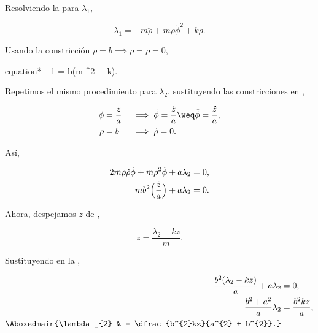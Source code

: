 \documentclass[../main.tex]{subfiles}
\begin{document}
\begin{problema}
	Resolviendo la  para \(\lambda_{1}\),

	\begin{equation*}
		\lambda_{1} = -m \ddot{\rho} + m\rho \dot{\phi}^{2} + k\rho.
	\end{equation*}

	Usando la constricción \(\rho = b \implies \ddot{\rho} = \ddot{\rho} = 0\),

	\begin{empheq}[box = \mainresult]{equation*}
		\lambda_{1} = b(m \dot{\phi}^{2} + k).
	\end{empheq}

	Repetimos el mismo procedimiento para \(\lambda_{2}\), sustituyendo
	las constricciones en ,

	\begin{alignat*}{2}
		\phi & = \dfrac{z}{a} & {}\implies{} & \dot{\phi} = \dfrac{\dot{z}}{a} \weq \ddot{\phi} = \dfrac{\ddot{z}}{a}, \\
		\rho & = b            & {}\implies{} & \dot{\rho} = 0.
	\end{alignat*}

	Así,

	\begin{align}
		2m\rho \dot{\rho} \dot{\phi} + m\rho^{2} \ddot{\phi} + a\lambda_{2} & = 0,\nonumber \\
		mb^{2}\Bigl(\dfrac{\ddot{z}}{a}\Bigr) + a\lambda_{2}                & = 0.
		\label{eq:l2-2nd-eom}
	\end{align}

	Ahora, despejamos \(\ddot{z}\) de ,

	\begin{equation*}
		\ddot{z} = \dfrac{\lambda_{2} - kz}{m}.
	\end{equation*}

	Sustituyendo en la ,

	\begin{align*}
		\dfrac{b^{2}(\lambda_{2} - kz)}{a} + a\lambda_{2} & = 0,                               \\
		\dfrac{b^{2} + a^{2}}{a}\lambda_{2}               & = \dfrac{b^{2}kz}{a},              \\
		\Aboxedmain{\lambda_{2}                           & = \dfrac{b^{2}kz}{a^{2} + b^{2}}.}
	\end{align*}
\end{problema}
\end{document}
